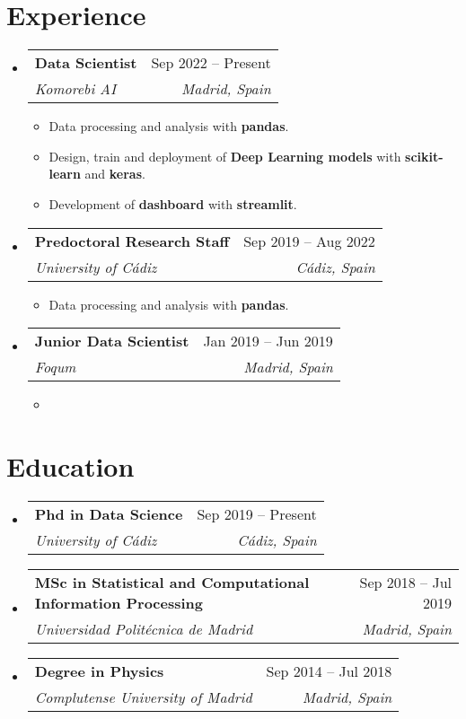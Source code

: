 \documentclass[a4paper,11pt]{article}
\makeatletter
\newcommand{\resumeItem}[1]{
	\item\small{#1}
}
\newcommand{\resumeItemListStart}{\begin{itemize}[rightmargin=0.11in]}
\newcommand{\resumeItemListEnd}{\end{itemize}}
\newcommand{\resumeQuadHeading}[4]{
	\item
	\begin{tabular*}{0.96\textwidth}[t]{l@{\extracolsep{\fill}}r}
		\textbf{#1} & #2 \\
		\textit{\small#3} & \textit{\small #4} \\
	\end{tabular*}
}
\newcommand{\resumeHeadingListStart}{
	\begin{itemize}[leftmargin=0.15in, label={}]
	}
\newcommand{\resumeHeadingListEnd}{\end{itemize}}
\makeatother
\begin{document}
	
	
	\section{Experience}
	\resumeHeadingListStart{}
	
	\resumeQuadHeading{Data Scientist}{Sep 2022 -- Present}
	{Komorebi AI}{Madrid, Spain}
	\resumeItemListStart{}
	\resumeItem{Data processing and analysis with \textbf{pandas}.}
	\resumeItem{Design, train and deployment of \textbf{Deep Learning models} with \textbf{scikit-learn} and \textbf{keras}.}
	\resumeItem{Development of \textbf{dashboard} with \textbf{streamlit}.}
	\resumeItemListEnd{}
	
	\resumeQuadHeading{Predoctoral Research Staff}{Sep 2019 -- Aug 2022}
	{University of C\'adiz}{C\'adiz, Spain}
	\resumeItemListStart{}
	\resumeItem{Data processing and analysis with \textbf{pandas}.}
	\resumeItemListEnd{}
	
	\resumeQuadHeading{Junior Data Scientist}{Jan 2019 -- Jun 2019}{Foqum}{Madrid, Spain}
	\resumeItemListStart{}
	\resumeItem{}
	\resumeItemListEnd{}
	
	\resumeHeadingListEnd{}
	
	
	
	\section{Education}
	\resumeHeadingListStart{}
	
	\resumeQuadHeading{Phd in Data Science}{Sep 2019 -- Present}
	{University of C\'adiz}{C\'adiz, Spain}
	
	\resumeQuadHeading{MSc in Statistical and Computational Information Processing}{Sep 2018 -- Jul 2019}
	{Universidad Polit\'ecnica de Madrid}{Madrid, Spain}
	
	\resumeQuadHeading{Degree in Physics}{Sep 2014 -- Jul 2018}
	{Complutense University of Madrid}{Madrid, Spain}
	
	\resumeHeadingListEnd{}
	
	
	
\end{document}
